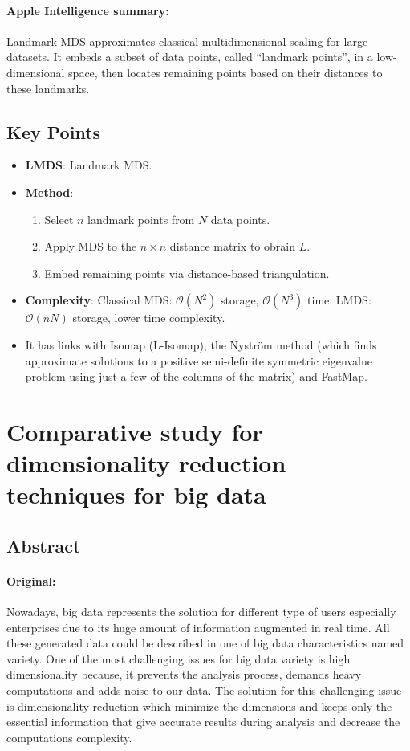 \documentclass[a4paper,12pt]{article}
\begin{document}
\paragraph{Apple Intelligence summary:} Landmark MDS approximates classical multidimensional scaling for large datasets. It embeds a subset of data points, called “landmark points”, in a low-dimensional space, then locates remaining points based on their distances to these landmarks.


\subsection{Key Points}

\begin{itemize}
    \item \textbf{LMDS}: Landmark MDS.
    \item \textbf{Method}:
        \begin{enumerate}
            \item Select $n$ landmark points from $N$ data points.
            \item Apply MDS to the $n \times n$ distance matrix to obrain $L$.
            \item Embed remaining points via distance-based triangulation.
        \end{enumerate}
    \item \textbf{Complexity}: Classical MDS: $\mathcal{O}(N^2)$ storage, $\mathcal{O}(N^3)$ time. LMDS: $\mathcal{O}(nN)$ storage, lower time complexity.
    \item It has links with Isomap (L-Isomap), the Nyström method (which finds approximate solutions to a positive semi-definite symmetric eigenvalue problem using just a few of the columns of the matrix) and FastMap.
\end{itemize}


\pagebreak
\section{Comparative study for dimensionality reduction techniques for big data \texorpdfstring{\cite{SalahHenouda2020}}{}}
\label{sec:SalahHenouda2020}

\subsection{Abstract}

\paragraph{Original:} Nowadays, big data represents the solution for different type of users especially enterprises due to its huge amount of information augmented in real time. All these generated data could be described in one of big data characteristics named variety. One of the most challenging issues
for big data variety is high dimensionality because, it prevents the analysis process, demands heavy computations and adds noise to our data. The solution for this challenging issue is dimensionality reduction which minimize the dimensions and keeps only the essential information that give accurate results during analysis and decrease the computations complexity.
\end{document}
